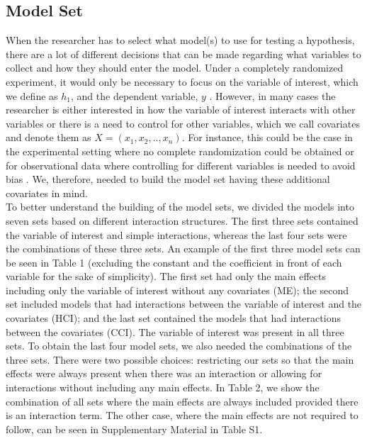 \subsection{Model Set}
When the researcher has to select what model(s) to use for testing a hypothesis, there are a lot of different decisions that can be made regarding what variables to collect and how they should enter the model. Under a completely randomized experiment, it would only be necessary to focus on the variable of interest, which we define as $h_1$, and the dependent variable, $y$ \citep{angrist2008mostly}. However, in many cases the researcher is either interested in how the variable of interest interacts with other variables or there is a need to control for other variables, which we call covariates and denote them as $X=(x_1,x_2,..,x_n)$. For instance, this could be the case in the experimental setting where no complete randomization could be obtained or for observational data where controlling for different variables is needed to avoid bias \citep{angrist2008mostly}. We, therefore, needed to build the model set having these additional covariates in mind. \\ 
To better understand the building of the model sets, we divided the models into seven sets based on different interaction structures. The first three sets contained the variable of interest and simple interactions, whereas the last four sets were the combinations of these three sets. An example of the first three model sets can be seen in Table 1 (excluding the constant and the coefficient in front of each variable for the sake of simplicity). The first set had only the main effects including only the variable of interest without any covariates (ME); the second set included models that had interactions between the variable of interest and the covariates (HCI); and the last set contained the models that had interactions between the covariates (CCI). The variable of interest was present in all three sets.
To obtain the last four model sets, we also needed the combinations of the three sets. There were two possible choices: restricting our sets so that the main effects were always present when there was an interaction or allowing for interactions without including any main effects. In Table 2, we show the combination of all sets where the main effects are always included provided there is an interaction term. The other case, where the main effects are not required to follow, can be seen in Supplementary Material in Table S1. \\

